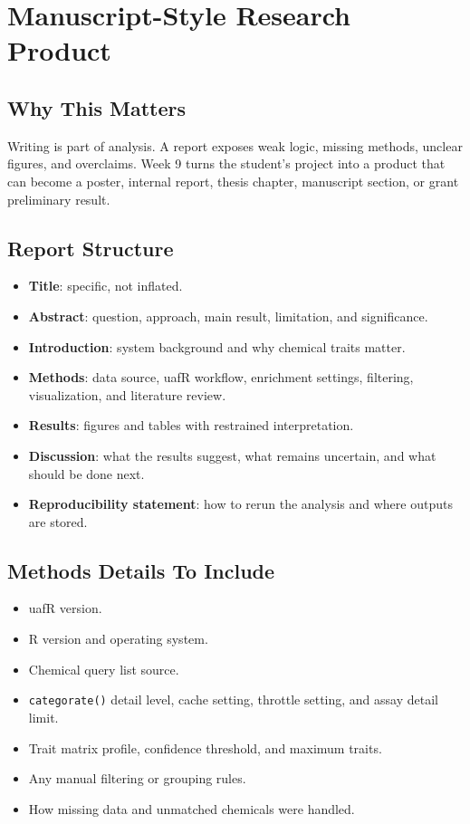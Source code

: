 \chapter{Manuscript-Style Research Product}


\section{Why This Matters}
Writing is part of analysis. A report exposes weak logic, missing methods, unclear figures, and overclaims. Week 9 turns the student's project into a product that can become a poster, internal report, thesis chapter, manuscript section, or grant preliminary result.

\section{Report Structure}
\begin{itemize}
  \item \textbf{Title}: specific, not inflated.
  \item \textbf{Abstract}: question, approach, main result, limitation, and significance.
  \item \textbf{Introduction}: system background and why chemical traits matter.
  \item \textbf{Methods}: data source, uafR workflow, enrichment settings, filtering, visualization, and literature review.
  \item \textbf{Results}: figures and tables with restrained interpretation.
  \item \textbf{Discussion}: what the results suggest, what remains uncertain, and what should be done next.
  \item \textbf{Reproducibility statement}: how to rerun the analysis and where outputs are stored.
\end{itemize}

\section{Methods Details To Include}
\begin{itemize}
  \item uafR version.
  \item R version and operating system.
  \item Chemical query list source.
  \item \texttt{categorate()} detail level, cache setting, throttle setting, and assay detail limit.
  \item Trait matrix profile, confidence threshold, and maximum traits.
  \item Any manual filtering or grouping rules.
  \item How missing data and unmatched chemicals were handled.
\end{itemize}

